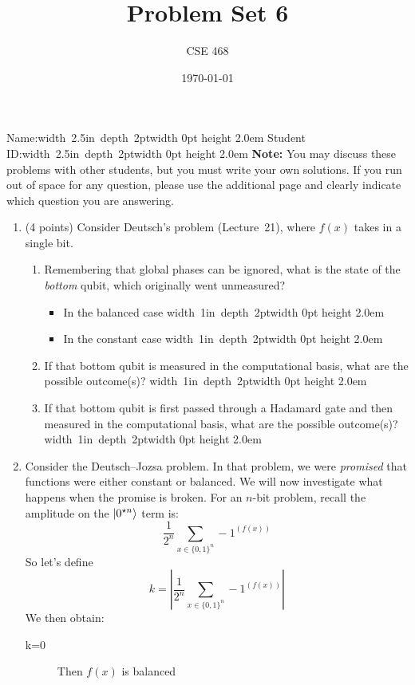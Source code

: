 \documentclass[12pt]{article}
\title{Problem Set 6}
\author{CSE 468}
\date{\today}
\newcommand{\Blank}{\mbox{\hskip 4pt\vrule width 1in depth 2pt}\vrule width 0pt height 2.0em}
\newcommand{\NameBlank}{\mbox{\hskip 4pt\vrule width 2.5in depth 2pt}\vrule width 0pt height 2.0em}
\begin{document}
\maketitle

\noindent Name:\NameBlank{} \newline
\noindent Student ID:\NameBlank{} \newline
\textbf{Note:} You may discuss these problems with other students, but you must write your own solutions. If you run out of space for any question, please use the additional page and clearly indicate which question you are answering.

\begin{enumerate}[font=\bfseries]
    \item (4 points) Consider Deutsch's problem (Lecture~21), where $f(x)$ takes in a single bit.
    \begin{enumerate}
        \item Remembering that global phases can be ignored, what is the state of the \emph{bottom} qubit, which originally went unmeasured?
        \begin{itemize}
            \item In the balanced case \Blank{}
            \item In the constant case
            \Blank{}
        \end{itemize}
        \item If that bottom qubit is measured in the computational basis, what are the possible outcome(s)? \Blank{}
        \item If that bottom qubit is first passed through a Hadamard gate and then measured in the computational basis, what are the possible outcome(s)?\Blank{}
    \end{enumerate}
    \newpage
     \item Consider the Deutsch--Jozsa problem. In that problem, we were \emph{promised} that functions were either constant or balanced. We will now investigate what happens when the promise is broken.  For an $n$-bit problem, recall the amplitude on the $\ket{0^{\star n}}$ term is:
     \[
       \frac{1}{2^n}\sum_{x\in \{0,1\}^{n}} -1^{(f(x))}
     \]
     So let's define
         \[
       k = \left|\frac{1}{2^n}\sum_{x\in \{0,1\}^{n}} -1^{(f(x))}\right|
     \]
     We then obtain:
     \begin{description}
         \item[k=0] Then $f(x)$ is balanced

\end{description}
\end{enumerate}
\end{document}
